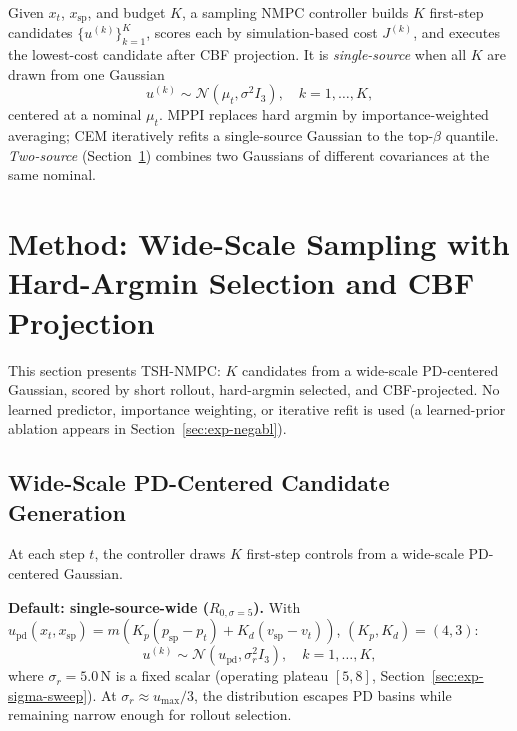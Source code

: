 \documentclass[11pt,onecolumn,a4paper]{article}
\newcommand{\spt}{\mathrm{sp}}
\newcommand{\pd}{\mathrm{pd}}
\begin{document}
Given $x_t$, $x_\spt$, and budget $K$, a sampling NMPC controller
builds $K$ first-step candidates $\{u^{(k)}\}_{k=1}^{K}$, scores each
by simulation-based cost $J^{(k)}$, and executes the lowest-cost
candidate after CBF projection. It is \emph{single-source} when all
$K$ are drawn from one Gaussian
\begin{equation}\label{eq:single}
u^{(k)} \sim \mathcal{N}(\mu_t, \sigma^2 I_3),\quad k = 1,\dots,K,
\end{equation}
centered at a nominal $\mu_t$. MPPI \cite{WIL17} replaces hard
argmin by importance-weighted averaging; CEM \cite{BOT13} iteratively
refits a single-source Gaussian to the top-$\beta$ quantile.
\emph{Two-source} (Section~\ref{sec:method}) combines two Gaussians of
different covariances at the same nominal.

\section{Method: Wide-Scale Sampling with Hard-Argmin Selection and CBF Projection}\label{sec:method}

This section presents TSH-NMPC: $K$ candidates from a wide-scale
PD-centered Gaussian, scored by short rollout, hard-argmin selected,
and CBF-projected. No learned predictor, importance weighting, or
iterative refit is used (a learned-prior ablation appears in
Section~\ref{sec:exp-negabl}).

\subsection{Wide-Scale PD-Centered Candidate Generation}

At each step $t$, the controller draws $K$ first-step controls from a
wide-scale PD-centered Gaussian.

\textbf{Default: single-source-wide ($R_{0,\sigma=5}$).} With
$u_\pd(x_t, x_\spt) = m (K_p (p_\spt - p_t) + K_d (v_\spt - v_t))$,
$(K_p, K_d) = (4, 3)$:
\begin{equation}\label{eq:srcA}
u^{(k)} \sim \mathcal{N}(u_\pd, \sigma_r^2 I_3),\quad k = 1, \ldots, K,
\end{equation}
where $\sigma_r = 5.0\,$N is a fixed scalar (operating plateau
$[5, 8]$, Section~\ref{sec:exp-sigma-sweep}). At
$\sigma_r \approx u_{\max}/3$, the distribution escapes PD basins
while remaining narrow enough for rollout selection.
\end{document}
